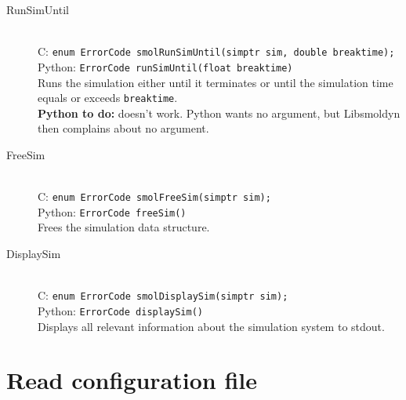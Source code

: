 \documentclass {book}
\begin{document}
\begin{description}
\item[RunSimUntil]
\hfill \\
C: \texttt{enum ErrorCode smolRunSimUntil(simptr sim, double breaktime);}\\
Python: \texttt{ErrorCode runSimUntil(float breaktime)}\\
Runs the simulation either until it terminates or until the simulation time equals or exceeds \texttt{breaktime}.\\
\textbf{Python to do:} doesn't work. Python wants no argument, but Libsmoldyn then complains about no argument.

\item[FreeSim]
\hfill \\
C: \texttt{enum ErrorCode smolFreeSim(simptr sim);}\\
Python: \texttt{ErrorCode freeSim()}\\
Frees the simulation data structure.

\item[DisplaySim]
\hfill \\
C: \texttt{enum ErrorCode smolDisplaySim(simptr sim);}\\
Python: \texttt{ErrorCode displaySim()}\\
Displays all relevant information about the simulation system to stdout.

\end{description}

\section{Read configuration file}
\end{document}
